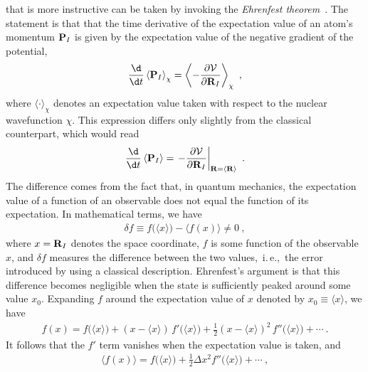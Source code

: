  that is more instructive can be taken by invoking the \emph{Ehrenfest theorem}~\cite{Ehrenfest1927,Basdevant2007}. The statement is that that the time derivative of the expectation value of an atom's momentum ${\bf P}_I$ is given by the expectation value of the negative gradient of the potential,
\begin{align}
\frac{\d}{\d t} \left\langle {\bf P}_I \right\rangle_{\chi}
= \left\langle
- \frac{\partial \mathcal{V}}{\partial {\bf R}_I}
\right\rangle_{\chi}~,
\label{eq:ehrenfest.de1}
\end{align}
where $\langle \cdot \rangle_{\chi}$ denotes an expectation value taken with respect to the nuclear wavefunction $\chi$. This expression differs only slightly from the classical counterpart, which would read
\begin{align}
\frac{\d}{\d t} \left\langle {\bf P}_I \right\rangle
= \left.
- \frac{\partial \mathcal{V}}{\partial {\bf R}_I}
\right\vert_{{\bf R} = \langle {\bf R} \rangle}~.
\label{eq:ehrenfest.de2}
\end{align}
The difference comes from the fact that, in quantum mechanics, the expectation value of a function of an observable does not equal the function of its expectation. In mathematical terms, we have
\begin{align}
\delta f  \equiv 
f \bm ( \langle x \rangle \bm{)} 
- 
\bm{\langle} f (x) \bm{\rangle}
\neq 0
~,
\label{eq:ehrenfest.delta1}
\end{align}
where $x = {\bf R}_I$ denotes the space coordinate, %
$f$ is some function of the observable   $x$, and $\delta f$ measures the difference between the two values,~i.\,e.,~the error introduced by using a classical description. Ehrenfest's argument is that this difference becomes negligible when the state is sufficiently peaked around some value $x_0$. Expanding $f$ around the expectation value of $x$ denoted by $x_0 \equiv \langle x \rangle$, we have
\begin{align}
f(x) = f \bm ( \langle x \rangle \bm{)}  
+ (x - \langle x \rangle) \, f' \bm ( \langle x \rangle \bm{)}
+ \frac{1}{2} (x - \langle x \rangle)^2 \, f'' \bm ( \langle x \rangle \bm{)}
+ \cdots~.
\label{eq:ehrenfest.f2}
\end{align}
It follows that the $f'$ term vanishes when the expectation value is taken, and
\begin{align}
\langle f(x) \rangle 
= f \bm ( \langle x \rangle \bm{)}  
+ \frac{1}{2} \Delta x^2 f'' \bm ( \langle x \rangle \bm{)}
+ \cdots~,
\label{eq:ehrenfest.f3}
\end{align}
